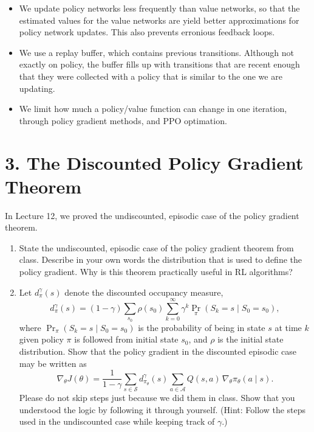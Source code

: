 \documentclass[11pt]{article}
\begin{document}
\begin{enumerate}
\begin{itemize}
            \item We update policy networks less frequently than value networks, so that the estimated values for the value networks are yield better approximations for policy network updates. This also prevents erronious feedback loops.
            \item We use a replay buffer, which contains previous transitions. Although not exactly on policy, the buffer fills up with transitions that are recent enough that they were collected with a policy that is similar to the one we are updating.
            \item We limit how much a policy/value function can change in one iteration, through policy gradient methods, and PPO optimation.
        \end{itemize}
\end{enumerate}


\section*{3. The Discounted Policy Gradient Theorem}
In Lecture 12, we proved the undiscounted, episodic case of the policy gradient theorem.
\begin{enumerate}
    \item[(a)] State the undiscounted, episodic case of the policy gradient theorem from class. Describe in your own words the distribution that is used to define the policy gradient. Why is this theorem practically useful in RL algorithms?
    \item[(b)] Let $d_\pi^\gamma(s)$ denote the discounted occupancy measure,
    \[
    d_\pi^\gamma(s) = (1-\gamma)\sum_{s_0}\rho(s_0)\sum_{k=0}^\infty \gamma^k \Pr_\pi(S_k = s \mid S_0 = s_0),
    \]
    where $\Pr_\pi(S_k = s \mid S_0 = s_0)$ is the probability of being in state $s$ at time $k$ given policy $\pi$ is followed from initial state $s_0$, and $\rho$ is the initial state distribution. Show that the policy gradient in the discounted episodic case may be written as
    \[
    \nabla_\theta J(\theta) = \frac{1}{1-\gamma} \sum_{s\in\mathcal{S}} d_{\pi_\theta}^\gamma(s) \sum_{a\in\mathcal{A}} Q(s,a)\,\nabla_\theta \pi_\theta(a\mid s).
    \]
    Please do not skip steps just because we did them in class. Show that you understood the logic by following it through yourself. (Hint: Follow the steps used in the undiscounted case while keeping track of $\gamma$.)
\end{enumerate}
\end{document}
